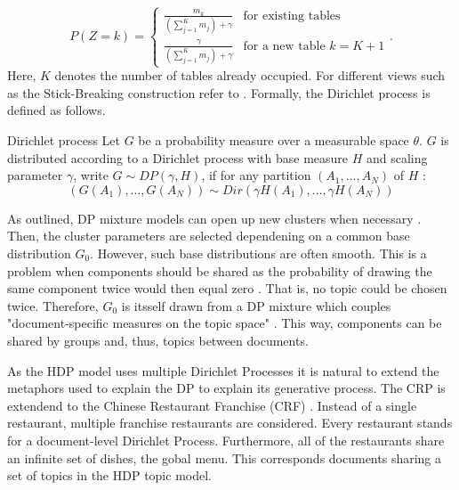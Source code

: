\begin{equation}
P(Z=k) = \begin{cases} 
      \frac{m_k}{(\sum_{j=1}^K m_j)+\gamma}& \text{for existing tables} \\
      \frac{\gamma}{(\sum_{j=1}^K m_j)+\gamma} & \text{for a new table } k=K+1
   \end{cases}\text{.}
\end{equation}
Here, $K$ denotes the number of tables already occupied. For different views such as the Stick-Breaking construction refer to \cite{Teh04hierarchicaldirichlet,DBLP:phd/dnb/Kling16,frigyik2010introduction}.
Formally, the Dirichlet process is defined as follows.
\begin{definition}{Dirichlet process}\label{DP} Let $G$ be a probability measure over a measurable space $\theta$. $G$ is distributed according to a Dirichlet process with base measure $H$ and scaling parameter $\gamma$, write $G \sim DP(\gamma, H)$, if for any partition $(A_1,...,A_N)$ of $H$ \cite{ferguson73,Teh04hierarchicaldirichlet,DBLP:phd/dnb/Kling16}:
\begin{equation}
(G(A_1),...,G(A_N)) \sim Dir(\gamma H(A_1),...,\gamma H(A_N))
\end{equation}
\end{definition}
As outlined, DP mixture models can open up new clusters when necessary \cite{Teh04hierarchicaldirichlet}. Then, the cluster parameters are selected dependening on a common base distribution $G_0$. However, such base distributions are often smooth. This is a problem when components should be shared as the probability of drawing the same component twice would then equal zero \cite{Teh04hierarchicaldirichlet, DBLP:phd/dnb/Kling16}. That is, no topic could be chosen twice. Therefore, $G_0$ is itsself drawn from a DP mixture which couples "document-specific measures on the topic space" \cite{DBLP:phd/dnb/Kling16}. This way, components can be shared by groups \cite{Teh04hierarchicaldirichlet} and, thus, topics between documents. \par
As the HDP model uses multiple Dirichlet Processes it is natural to extend the metaphors used to explain the DP to explain its generative process.
The CRP is extendend to the Chinese Restaurant Franchise (CRF) \cite{Teh04hierarchicaldirichlet}. Instead of a single restaurant, multiple franchise restaurants are considered. Every restaurant stands for a document-level Dirichlet Process. Furthermore, all of the restaurants share an infinite set of dishes, the gobal menu. This corresponds documents sharing a set of topics in the HDP topic model.

